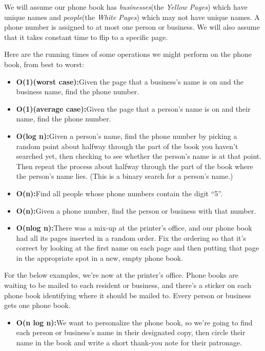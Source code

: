 \begin{displayquote}

{We will assume our phone book has \emph{{businesses}}(the \textit{Yellow
Pages}) which have unique names and \emph{{people}}(the \textit{White Pages})
which may not have unique names. A phone number is assigned to at most
one person or business. We will also assume that it takes constant time
to flip to a specific page.}

{Here are the running times of some operations we might perform on the
phone book, from best to worst:}

\begin{itemize}
\item
  \textbf{{O(1)(worst case):}}{Given the page that a business's
  name is on and the business name, find the phone number.}
\item
  \textbf{{O(1)(average case):}}{Given the page that a person's
  name is on and their name, find the phone number.}
\item
  \textbf{{O(log n):}}{Given a person's name, find the phone
  number by picking a random point about halfway through the part of the
  book you haven't searched yet, then checking to see whether the
  person's name is at that point. Then repeat the process about halfway
  through the part of the book where the person's name lies. (This is a
  binary search for a person's name.)}
\item
  \textbf{{O(n):}}{Find all people whose phone numbers contain the
  digit ``5''.}
\item
  \textbf{{O(n):}}{Given a phone number, find the person or
  business with that number.}
\item
  \textbf{{O(nlog n):}}{There was a mix-up at the printer's
  office, and our phone book had all its pages inserted in a random
  order. Fix the ordering so that it's correct by looking at the first
  name on each page and then putting that page in the appropriate spot
  in a new, empty phone book.}
\end{itemize}

{For the below examples, we're now at the printer's office. Phone books
are waiting to be mailed to each resident or business, and there's a
sticker on each phone book identifying where it should be mailed to.
Every person or business gets one phone book.}

\begin{itemize}

	\item \textbf{{O(n log n):}}{We want to personalize the phone book, so
we're going to find each person or business's name in their designated
copy, then circle their name in the book and write a short thank-you
note for their patronage.}


\end{itemize}
\end{displayquote}

